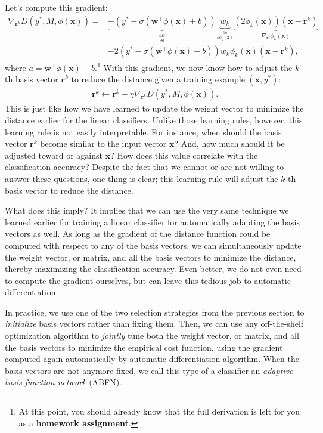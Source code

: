 \documentclass{report}
\newcommand{\vect}[1]{\mathbf{#1}}
\newcommand{\vx}[0]{\vect{x}}
\newcommand{\vw}[0]{\vect{w}}
\newcommand{\vr}[0]{\vect{r}}
\begin{document}
Let's compute this gradient:
\begin{align*}
    \nabla_{\vr^k} D(y^*, M, \phi(\vx)) =&
    \underbrace{-(y^* - \sigma(\vw^\top \phi(\vx) + b))}_{
        \frac{\partial D}{\partial a}
    }
    \underbrace{w_k}_{\frac{\partial a}{\partial \phi_k(\vx)}}
    \underbrace{(2 \phi_k(\vx)) (\vx - \vr^k)}_{
    \nabla_{\vr^k} \phi_k(\vx)} \\
    =& -2(y^* - \sigma(\vw^\top \phi(\vx) + b)) w_k \phi_k(\vx) (\vx - \vr^k)
    ,
\end{align*}
where $a = \vw^\top \phi(\vx) + b$.\footnote{
    At this point, you should already know that the full derivation is left for
    you as a {\bf homework assignment}.
}
With this gradient, we now know how to adjust the $k$-th basis vector $\vr^k$ to
reduce the distance given a training example $(\vx, y^*)$:
\begin{align*}
    \vr^k \leftarrow \vr^k - \eta \nabla_{\vr^k} D(y^*, M, \phi(\vx)).
\end{align*}
This is just like how we have learned to update the weight vector to minimize
the distance earlier for the linear classifiers.  Unlike those learning rules,
however, this learning rule is not easily interpretable. For instance, when
should the basis vector $\vr^k$ become similar to the input vector $\vx$? And,
how much should it be adjusted toward or against $\vx$? How does this value
correlate with the classification accuracy? Despite the fact that we cannot or
are not willing to answer these questions, one thing is clear; this learning
rule will adjust the $k$-th basis vector to reduce the distance.

What does this imply? It implies that we can use the very same technique we
learned earlier for training a linear classifier for automatically adapting the
basis vectors as well. As long as the gradient of the distance function could be
computed with respect to any of the basis vectors, we can simultaneously update
the weight vector, or matrix, and all the basis vectors to minimize the
distance, thereby maximizing the classification accuracy. Even better, we do not
even need to compute the gradient ourselves, but can leave this tedious job to
automatic differentiation. 

In practice, we use one of the two selection strategies from the previous
section to {\it initialize} basis vectors rather than fixing them. Then, we can
use any off-the-shelf optimization algorithm to {\it jointly} tune both the
weight vector, or matrix, and all the basis vectors to minimize the empirical
cost function, using the gradient computed again automatically by automatic
differentiation algorithm. When the basis vectors are not anymore fixed, we call
this type of a classifier an {\it adaptive basis function network} (ABFN). 
\end{document}
